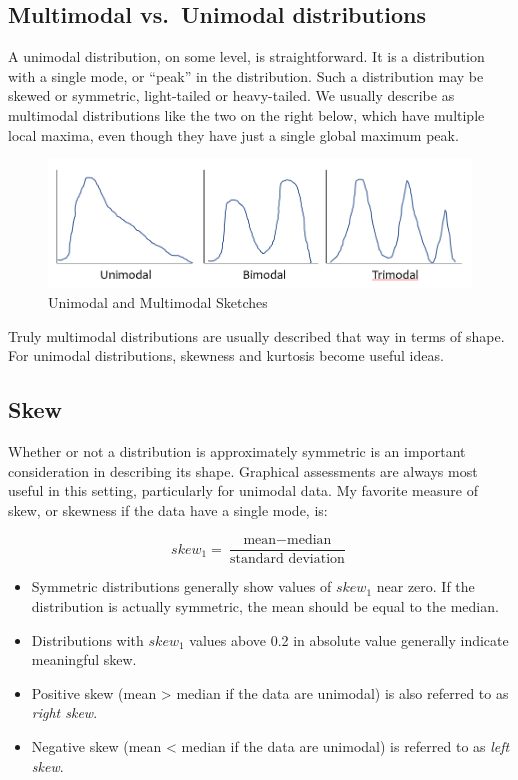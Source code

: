 \documentclass[
]{book}
\providecommand{\tightlist}{%
  \setlength{\itemsep}{0pt}\setlength{\parskip}{0pt}}
\begin{document}
\hypertarget{multimodal-vs.-unimodal-distributions}{%
\subsection{Multimodal vs.~Unimodal distributions}\label{multimodal-vs.-unimodal-distributions}}

A unimodal distribution, on some level, is straightforward. It is a distribution with a single mode, or ``peak'' in the distribution. Such a distribution may be skewed or symmetric, light-tailed or heavy-tailed. We usually describe as multimodal distributions like the two on the right below, which have multiple local maxima, even though they have just a single global maximum peak.

\begin{figure}
\includegraphics[width=0.9\linewidth]{figures/modality} \caption{Unimodal and Multimodal Sketches}\label{fig:modality-fig}
\end{figure}

Truly multimodal distributions are usually described that way in terms of shape. For unimodal distributions, skewness and kurtosis become useful ideas.

\hypertarget{skew}{%
\subsection{Skew}\label{skew}}

Whether or not a distribution is approximately symmetric is an important consideration in describing its shape. Graphical assessments are always most useful in this setting, particularly for unimodal data. My favorite measure of skew, or skewness if the data have a single mode, is:

\[
skew_1 = \frac{\mbox{mean} - \mbox{median}}{\mbox{standard deviation}}
\]

\begin{itemize}
\tightlist
\item
  Symmetric distributions generally show values of \(skew_1\) near zero. If the distribution is actually symmetric, the mean should be equal to the median.
\item
  Distributions with \(skew_1\) values above 0.2 in absolute value generally indicate meaningful skew.
\item
  Positive skew (mean \textgreater{} median if the data are unimodal) is also referred to as \emph{right skew}.
\item
  Negative skew (mean \textless{} median if the data are unimodal) is referred to as \emph{left skew}.
\end{itemize}
\end{document}
